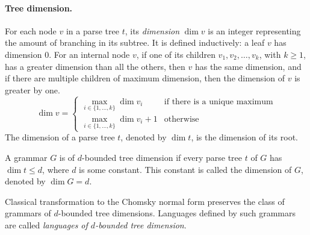 \documentclass[runningheads]{llncs}
\begin{document}
\paragraph{Tree dimension.} 
For each node $v$ in a parse tree $t$,
its \emph{dimension} $\dim v$ is an integer
representing the amount of branching in its subtree.
It is defined inductively: %
a leaf $v$ has dimension $0$.
For an internal node $v$, if one of its children $v_1, v_2, \ldots, v_k$, with $k \geqslant 1$,
has a greater dimension than all the others,
then $v$ has the same dimension,
and if there are multiple children of maximum dimension,
then the dimension of $v$ is greater by one.
\begin{equation*}
	\dim v
		=
	\begin{cases}
	\max_{i \in \{1, \ldots, k\}} \dim v_i
		&\text{if there is a unique maximum} \\
	\max_{i \in \{1, \ldots, k\}} \dim v_i +1
		&\text{otherwise}
	\end{cases}
\end{equation*}
The dimension of a parse tree $t$, denoted by $\dim t$, is the dimension of its root. 


\begin{definition}
A grammar $G$ is of $d$-bounded tree dimension
if every parse tree $t$ of $G$ has $\dim t \leqslant d$,
where $d$ is some constant.
This constant is called the dimension of $G$, denoted by $\dim G=d$.
\end{definition}

Classical transformation to the Chomsky normal form
preserves the class of grammars of $d$-bounded tree dimensions.
Languages defined by such grammars are called \emph{languages of $d$-bounded tree dimension}.
\end{document}
